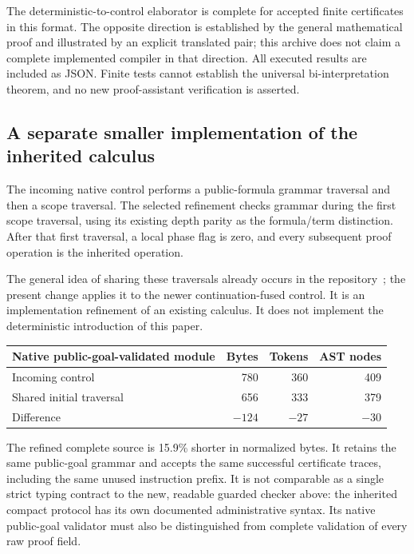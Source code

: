 The deterministic-to-control elaborator is complete for accepted finite
certificates in this format. The opposite direction is established by the
general mathematical proof and illustrated by an explicit translated pair;
this archive does not claim a complete implemented compiler in that direction.
All executed results are included as JSON. Finite tests cannot establish the
universal bi-interpretation theorem, and no new proof-assistant verification
is asserted.

\subsection{A separate smaller implementation of the inherited calculus}

The incoming native control performs a public-formula grammar traversal and
then a scope traversal. The selected refinement checks grammar during the
first scope traversal, using its existing depth parity as the formula/term
distinction. After that first traversal, a local phase flag is zero, and
every subsequent proof operation is the inherited operation.

The general idea of sharing these traversals already occurs in the
repository~\cite{scope}; the present change applies it to the newer
continuation-fused control. It is an implementation refinement of an existing
calculus. It does not implement the deterministic introduction of this paper.

\begin{center}
\begin{tabular}{lrrr}\toprule
Native public-goal-validated module & Bytes & Tokens & AST nodes\\\midrule
Incoming control & 780 & 360 & 409\\
Shared initial traversal & 656 & 333 & 379\\
Difference & $-124$ & $-27$ & $-30$\\\bottomrule
\end{tabular}
\end{center}

The refined complete source is 15.9\% shorter in normalized bytes. It retains
the same public-goal grammar and accepts the same successful certificate
traces, including the same unused instruction prefix. It is not comparable
as a single strict typing contract to the new, readable guarded checker above:
the inherited compact protocol has its own documented administrative syntax.
Its native public-goal validator must also be distinguished from complete
validation of every raw proof field.

